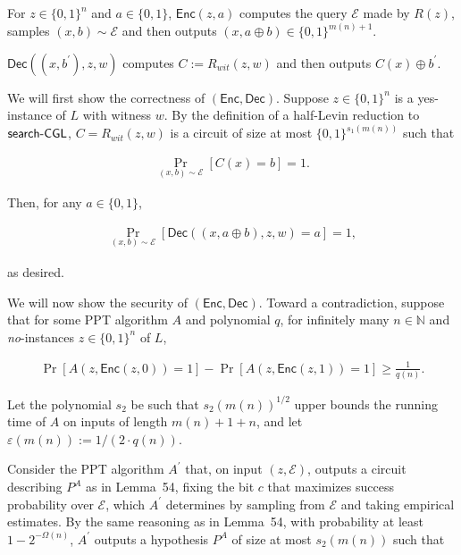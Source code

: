 For $z\in\{0,1\}^{n}$ and $a\in\{0,1\}$, ${\mathsf{Enc}}(z,a)$ computes the query $\mathcal{E}$ made by $R(z)$, samples $(x,b)\sim\mathcal{E}$ and then outputs $(x,a\oplus b)\in\{0,1\}^{m(n)+1}$.\par




${\mathsf{Dec}}((x,b^{\prime}),z,w)$ computes $C:=R_{wit}(z,w)$ and then outputs $C(x)\oplus b^{\prime}$.\par



We will first show the correctness of $({\mathsf{Enc}},{\mathsf{Dec}})$. Suppose $z\in\{0,1\}^{n}$ is a yes-instance of $L$ with witness $w$. By the definition of a half-Levin reduction to ${\sf search}\text{-}{\sf CGL}$, $C=R_{wit}(z,w)$ is a circuit of size at most $\{0,1\}^{s_{1}(m(n))}$ such that\par


\[\begin{gathered}
\Pr_{(x,b)\sim\mathcal{E}}[C(x)=b]=1.
\end{gathered}\]


Then, for any $a\in\{0,1\}$,\par


\[\begin{gathered}
\Pr_{(x,b)\sim\mathcal{E}}[{\mathsf{Dec}}((x,a\oplus b),z,w)=a]=1,
\end{gathered}\]


as desired.\par




We will now show the security of $({\mathsf{Enc}},{\mathsf{Dec}})$. Toward a contradiction, suppose that for some PPT algorithm $A$ and polynomial $q$, for infinitely many $n\in\mathbb{N}$ and \emph{no}-instances $z\in\{0,1\}^{n}$ of $L$,\par


\[\begin{gathered}
\Pr[A(z,{\mathsf{Enc}}(z,0))=1]-\Pr[A(z,{\mathsf{Enc}}(z,1))=1]\geq\frac{1}{q(n)}.
\end{gathered}\]


Let the polynomial $s_{2}$ be such that $s_{2}(m(n))^{1/2}$ upper bounds the running time of $A$ on inputs of length $m(n)+1+n$, and let $\varepsilon(m(n)):=1/(2\cdot q(n))$.\par




Consider the PPT algorithm $A^{\prime}$ that, on input $(z,\mathcal{E})$, outputs a circuit describing $P^{A}$ as in Lemma 54, fixing the bit $c$ that maximizes success probability over $\mathcal{E}$, which $A^{\prime}$ determines by sampling from $\mathcal{E}$ and taking empirical estimates.
By the same reasoning as in Lemma 54, with probability at least $1-2^{-\Omega(n)}$, $A^{\prime}$ outputs a hypothesis $P^{A}$ of size at most $s_{2}(m(n))$ such that\par


